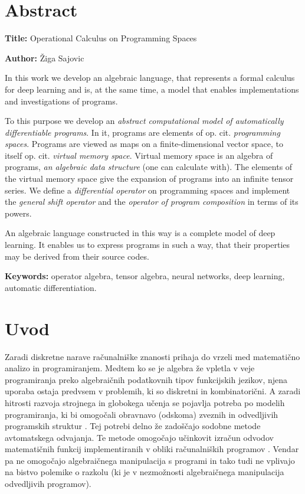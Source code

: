 \documentclass[a4paper, 12pt]{book}
\newcommand{\ttitleEn}{Operational Calculus on Programming Spaces}
\newcommand{\tauthor}{Žiga Sajovic}
\newcommand{\tkeywordsEn}{operator algebra, tensor algebra, neural networks, deep learning, automatic differentiation}
\newcommand{\clearemptydoublepage}{\newpage{\pagestyle{empty}\cleardoublepage}}
\begin{document}
\chapter*{Abstract}

\noindent\textbf{Title:} \ttitleEn
\bigskip

\noindent\textbf{Author:} \tauthor
\bigskip

\noindent 
In this work we develop an algebraic language, that represents a formal calculus for deep learning and is, at the same time, a model that enables implementations and investigations of programs.

To this purpose we develop an \emph{abstract computational model of automatically differentiable programs}. In it, programs are elements of op. cit. \emph{programming spaces}. Programs are viewed as maps on a finite-dimensional vector space, to itself op. cit. \emph{virtual memory space}. Virtual memory space is an algebra of programs, \emph{an algebraic data structure} (one can calculate with). The elements of the virtual memory space give the expansion of programs into an infinite tensor series. We define a \emph{differential operator} on programming spaces and implement the \emph{general shift operator} and the \emph{operator of program composition} in terms of its powers.

An algebraic language constructed in this way is a complete model of deep learning. It enables us to express programs in such a way, that their properties may be derived from their source codes.

\bigskip

\noindent\textbf{Keywords:} \tkeywordsEn.
\clearemptydoublepage

\mainmatter
\setcounter{page}{1}
\pagestyle{fancy}

\chapter{Uvod}

Zaradi diskretne narave računalniške znanosti prihaja do vrzeli med matematično analizo in programiranjem. Medtem ko se je algebra že vpletla v veje programiranja preko algebraičnih podatkovnih tipov funkcijskih jezikov, njena uporaba ostaja predvsem v problemih, ki so diskretni in kombinatorični. A zaradi hitrosti razvoja strojnega in globokega učenja se pojavlja potreba po modelih programiranja, ki bi omogočali obravnavo (odskoma) zveznih in odvedljivih programskih struktur \cite{AdSurvey}. Tej potrebi delno že zadoščajo sodobne metode avtomatskega odvajanja. Te metode omogočajo učinkovit izračun odvodov matematičnih funkcij implementiranih v obliki računalniških programov \cite{AD1}. Vendar pa ne omogočajo algebraičnega manipulacija s programi in tako tudi ne vplivajo na bistvo polemike o razkolu (ki je v nezmožnosti algebraičnega manipulacija odvedljivih programov).
\end{document}
